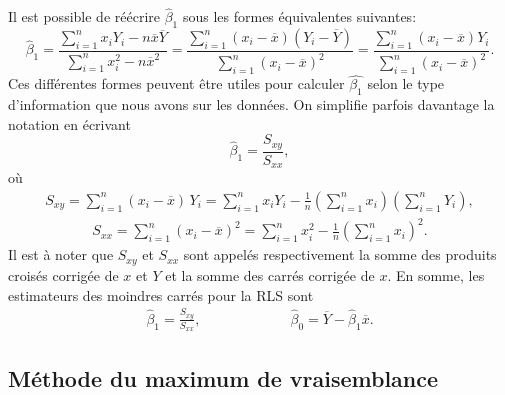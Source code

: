 Il est possible de réécrire $\widehat\beta_1$ sous les formes équivalentes suivantes:
\begin{equation*}
 \widehat{\beta}_1 =  \frac{\sum\limits_{i=1}^n x_i Y_i - n\overline{x}\overline{Y}}{\sum\limits_{i=1}^n x_i^2 - n\overline{x}^2}
 = \frac{\sum\limits_{i=1}^n (x_i-\overline{x})(Y_i-\overline{Y})}{\sum\limits_{i=1}^n (x_i-\overline{x})^2}
 = \frac{\sum\limits_{i=1}^n (x_i-\overline{x})Y_i}{\sum\limits_{i=1}^n (x_i-\overline{x})^2}.
 \label{eq:beta1}
\end{equation*}
Ces différentes formes peuvent être utiles pour calculer $\widehat{\beta_1}$ selon le type d'information que nous avons sur les données. On simplifie parfois davantage la notation en écrivant
\begin{equation}
 \widehat{\beta}_1  = \frac{S_{xy}}{S_{xx}},
\end{equation}
o\`u
\begin{eqnarray}
S_{xy}=\sum_{i=1}^n (x_i-\overline x)\,Y_i=\sum_{i=1}^nx_iY_i-\frac{1}{n}\left(\sum_{i=1}^n x_i\right)\left(\sum_{i=1}^n Y_i\right),
\label{eq:Sxy}
\end{eqnarray}
\begin{eqnarray}
S_{xx}=\sum_{i=1}^n(x_i-\overline x)^2=\sum_{i=1}^nx_i^2-\frac{1}{n}\left(\sum_{i=1}^n x_i\right)^2.
\label{eq:Sxx}
\end{eqnarray}
Il est à noter que $S_{xy}$ et $S_{xx}$ sont appelés respectivement la somme des produits croisés corrigée de $x$ et $Y$ et la somme des carrés corrigée de $x$.
En somme, les estimateurs des moindres carrés pour la RLS sont
\begin{eqnarray}
\hat \beta_1 = \frac{S_{xy}}{S_{xx}}, & \hspace{2cm} & \widehat\beta_0=\overline{Y} - \widehat\beta_1 \overline{x}. 
\end{eqnarray}



\subsection{Méthode du maximum de vraisemblance}

